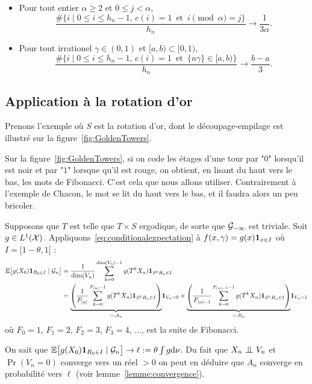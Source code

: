 \documentclass[12pt,a4paper]{article}
\begin{document}
\begin{itemize}
\item Pour tout entier $\alpha \geq 2$ et $0 \leq j < \alpha$,
$$
\frac{\#\bigl\{i \mid 0 \leq i \leq h_n-1,\, c(i)=1 \,\text{  et  }\, i\!\!\!\!\pmod\alpha=j \bigr\}}{h_n} \to \frac{1}{3\alpha}.
$$

\item Pour tout irrationel $\gamma \in (0,1)$ et $[a,b) \subset [0,1)$, 
$$
\frac{\#\bigl\{i \mid 0 \leq i \leq h_n-1,\, c(i)=1 \,\text{  et  }\,  \{n\gamma\} \in [a,b) \bigr\}}{h_n} \to \frac{b-a}{3}.
$$
\end{itemize}


\subsection{Application à la rotation d'or}


Prenons l'exemple où $S$ est la rotation d'or, dont le découpage-empilage 
est illustré sur la figure~\ref{fig:GoldenTowers}. 

Sur la figure~\ref{fig:GoldenTowers}, si on code les étages d'une tour 
par "$0$" lorsqu'il est noir et par "$1$" lorsque qu'il est rouge, on 
obtient, en lisant du haut vers le bas, les mots de Fibonacci. 
C'est cela que nous allons utiliser. 
Contrairement à l'exemple de Chacon, le mot se lit du haut vers le bas, 
et il faudra alors un peu bricoler.

Supposons que $T$ est telle que $T \times S$ ergodique, de sorte 
que $\mathcal{G}_{-\infty}$ est triviale.  
Soit $g \in L^1(\mathcal{X})$. 
Appliquons~\eqref{eq:conditionalexpectation} à 
$f(x,\gamma) = g(x)\boldsymbol 1_{x \in I}$ où $I=[1-\theta, 1[$ :
\begin{align*}
\mathbb{E}\bigl[g(X_0) \boldsymbol 1_{R_0 \in I} \mid \mathcal{G}_n\bigr]
&  = \frac{1}{\dim(V_n)}\sum_{k=0}^{\dim(V_n)-1} g(T^kX_n) \boldsymbol 1_{S^k R_n \in I} \\
& = \underset{=:A_n}{\underbrace{\left(\frac{1}{F_{|n|}}\sum_{k=0}^{F_{|n|}-1} g(T^kX_n) \boldsymbol 1_{S^k R_n \in I}\right)}}\boldsymbol 1_{V_n=0} 
+ \underset{=:B_n}{\underbrace{\left(\frac{1}{F_{|n|-1}}\sum_{k=0}^{F_{|n|-1}-1} g(T^kX_n) \boldsymbol 1_{S^k R_n \in I}\right)}}\boldsymbol 1_{V_n=1}
\end{align*}
où $F_0=1$, $F_1=2$, $F_2=3$, $F_3=4$, $\ldots$, est la suite de Fibonacci. 

On sait que 
$\mathbb{E}\bigl[g(X_0) \boldsymbol 1_{R_0 \in I} \mid \mathcal{G}_n\bigr] \to \ell:= \theta\int g \mathrm{d}\nu$. 
Du fait que $X_n \indep V_n$  et $\Pr(V_n=0)$ converge vers un réel $>0$ on peut en 
déduire que $A_n$ converge en probabilité vers $\ell$ (voir lemme~\ref{lemme:convergence}). 
\end{document}
